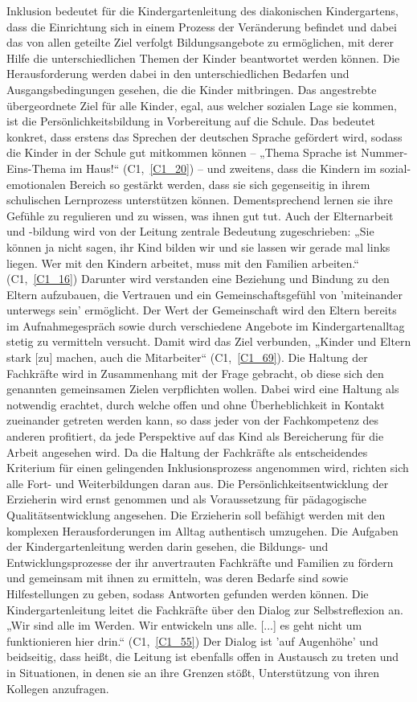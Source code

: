 Inklusion bedeutet für die Kindergartenleitung des diakonischen Kindergartens, dass die Einrichtung sich in einem Prozess der Veränderung befindet und dabei das von allen geteilte Ziel verfolgt Bildungsangebote zu ermöglichen, mit derer Hilfe die unterschiedlichen Themen der Kinder beantwortet werden können. Die Herausforderung werden dabei in den unterschiedlichen Bedarfen und Ausgangsbedingungen gesehen, die die Kinder mitbringen. 
Das angestrebte übergeordnete Ziel für alle Kinder, egal, aus welcher sozialen Lage sie kommen, ist die Persönlichkeitsbildung in Vorbereitung auf die Schule. Das bedeutet konkret, dass erstens das Sprechen der deutschen Sprache gefördert wird, sodass die Kinder in der Schule gut mitkommen können -- „Thema Sprache ist Nummer-Eins-Thema im Haus!“ (C1,~\ref{C1_20}) -- und zweitens, dass die Kindern im sozial-emotionalen Bereich so gestärkt werden, dass sie sich gegenseitig in ihrem schulischen Lernprozess unterstützen können. Dementsprechend lernen sie ihre Gefühle zu regulieren und zu wissen, was ihnen gut tut. 
Auch der Elternarbeit und -bildung wird von der Leitung zentrale Bedeutung zugeschrieben: „Sie können ja nicht sagen, ihr Kind bilden wir und sie lassen wir gerade mal links liegen. Wer mit den Kindern arbeitet, muss mit den Familien arbeiten.“ (C1,~\ref{C1_16}) Darunter wird verstanden eine Beziehung und Bindung zu den Eltern aufzubauen, die Vertrauen und ein Gemeinschaftsgefühl von 'miteinander unterwegs sein' ermöglicht. Der Wert der Gemeinschaft wird den Eltern bereits im Aufnahmegespräch sowie durch verschiedene Angebote im Kindergartenalltag stetig zu vermitteln versucht. Damit wird das Ziel verbunden, „Kinder und Eltern stark [zu] machen, auch die Mitarbeiter“ (C1,~\ref{C1_69}).
Die Haltung der Fachkräfte wird in Zusammenhang mit der Frage gebracht, ob diese sich den genannten gemeinsamen Zielen verpflichten wollen.
Dabei wird eine Haltung als notwendig erachtet, durch welche offen und ohne Überheblichkeit in Kontakt zueinander getreten werden kann, so dass jeder von der Fachkompetenz des anderen profitiert, da jede Perspektive auf das Kind als Bereicherung für die Arbeit angesehen wird.
Da die Haltung der Fachkräfte als entscheidendes Kriterium für einen gelingenden Inklusionsprozess angenommen wird, richten sich alle Fort- und Weiterbildungen daran aus. Die Persönlichkeitsentwicklung der Erzieherin wird ernst genommen und als Voraussetzung für pädagogische Qualitätsentwicklung angesehen. Die Erzieherin soll befähigt werden mit den komplexen Herausforderungen im Alltag authentisch umzugehen.
Die Aufgaben der Kindergartenleitung werden darin gesehen, die Bildungs- und Entwicklungsprozesse der ihr anvertrauten Fachkräfte und Familien zu fördern und gemeinsam mit ihnen zu ermitteln, was deren Bedarfe sind sowie Hilfestellungen zu geben, sodass Antworten gefunden werden können. Die Kindergartenleitung leitet die Fachkräfte über den Dialog zur Selbstreflexion an. „Wir sind alle im Werden. Wir entwickeln uns alle. [...] es geht nicht um funktionieren hier drin.“ (C1,~\ref{C1_55}) Der Dialog ist 'auf Augenhöhe' und beidseitig, dass heißt, die Leitung ist ebenfalls offen in Austausch zu treten und in Situationen, in denen sie an ihre Grenzen stößt, Unterstützung von ihren Kollegen anzufragen. 
